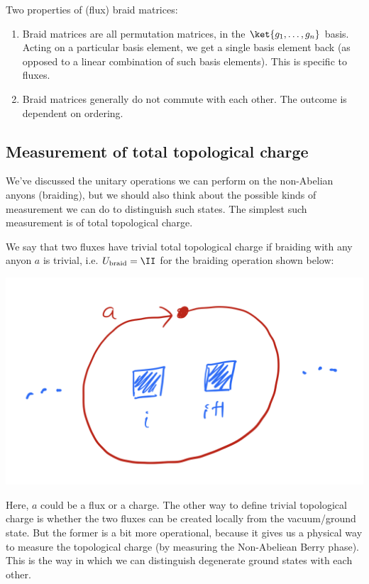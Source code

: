 Two properties of (flux) braid matrices:
\begin{enumerate}
    \item Braid matrices are all permutation matrices, in the $\ket{g_1, \ldots, g_n}$ basis. Acting on a particular basis element, we get a single basis element back (as opposed to a linear combination of such basis elements). This is specific to fluxes.
    \item Braid matrices generally do not commute with each other. The outcome is dependent on ordering.
\end{enumerate}

\subsection{Measurement of total topological charge}
We've discussed the unitary operations we can perform on the non-Abelian anyons (braiding), but we should also think about the possible kinds of measurement we can do to distinguish such states. The simplest such measurement is of total topological charge.

We say that two fluxes have trivial total topological charge if braiding with any anyon $a$ is trivial, i.e. $U_{\text{braid}} = \II$ for the braiding operation shown below:

\begin{center}
    \includegraphics[scale=0.35]{Lectures/Images/lec10-anyonbraid.png}
\end{center}

Here, $a$ could be a flux or a charge. The other way to define trivial topological charge is whether the two fluxes can be created locally from the vacuum/ground state. But the former is a bit more operational, because it gives us a physical way to measure the topological charge (by measuring the Non-Abeliean Berry phase). This is the way in which we can distinguish degenerate ground states with each other.

